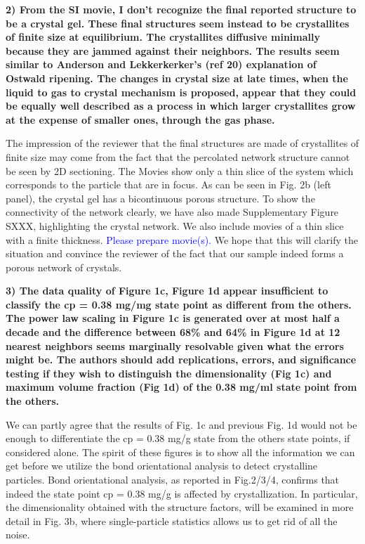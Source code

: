 \documentclass[11pt,a4paper]{article}
\newenvironment{referee}%
{\bigskip\singlespacing\bf}%
{\par\bigskip}
\begin{document}
\begin{referee}
2) From the SI movie, I don't recognize the final reported structure to be a crystal gel. These final structures seem instead to be crystallites of finite size at equilibrium. The crystallites diffusive minimally because they are jammed against their neighbors. The results seem similar to Anderson and Lekkerkerker's (ref 20) explanation of Ostwald ripening. The changes in crystal size at late times, when the liquid to gas to crystal mechanism is proposed, appear that they could be equally well described as a process in which larger crystallites grow at the expense of smaller ones, through the gas phase.
\end{referee}

The impression of the reviewer that the final structures are made of crystallites of finite size may come from the fact that the percolated network structure cannot be seen by 2D sectioning. The Movies show only a thin slice of the system which corresponds to the particle that are in focus. 
As can be seen in Fig. 2b (left panel), the crystal gel has a bicontinuous porous structure. 
To show the connectivity of the network clearly, we have also made Supplementary Figure SXXX, highlighting the crystal network.
We also include movies of a thin slice with a finite thickness. \textcolor{blue}{Please prepare movie(s).} 
We hope that this will clarify the situation and convince the reviewer of the fact that our sample indeed forms a porous network of crystals. 


\begin{referee}
3) The data quality of Figure 1c, Figure 1d appear insufficient to classify the cp = 0.38 mg/mg state point as different from the others. The power law scaling in Figure 1c is generated over at most half a decade and the difference between 68\% and 64\% in Figure 1d at 12 nearest neighbors seems marginally resolvable given what the errors might be. The authors should add replications, errors, and significance testing if they wish to distinguish the dimensionality (Fig 1c) and maximum volume fraction (Fig 1d) of the 0.38 mg/ml state point from the others.
\end{referee}

We can partly agree that the results of Fig. 1c and previous Fig. 1d would not be enough to differentiate the  cp = 0.38 mg/g state from the others
state points, if considered alone. The spirit of these figures is to show all the information we can get before we utilize the bond orientational
analysis to detect crystalline particles. Bond orientational analysis, as reported in Fig.2/3/4, confirms
that indeed the state point cp = 0.38 mg/g is affected by crystallization. In particular, the dimensionality obtained
with the structure factors, will be examined in more detail in Fig. 3b, where single-particle statistics allows us to get rid of all the noise.
\end{document}
